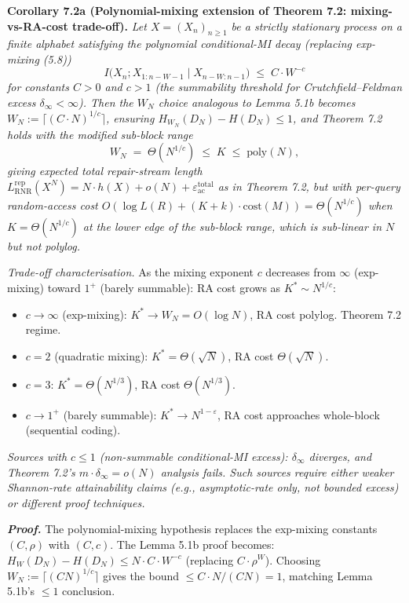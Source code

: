 \documentclass[
]{article}
\begin{document}
\textbf{Corollary 7.2a (Polynomial-mixing extension of Theorem 7.2:
mixing-vs-RA-cost trade-off).} \emph{Let $X = (X_n)_{n \geq 1}$ be
a strictly stationary process on a finite alphabet satisfying the
\emph{polynomial} conditional-MI decay (replacing exp-mixing (5.8))}
\[
I\bigl(X_n; X_{1:n-W-1} \mid X_{n-W:n-1}\bigr) \;\leq\; C \cdot W^{-c}
\]
\emph{for constants $C > 0$ and $c > 1$ (the summability threshold
for Crutchfield--Feldman excess $\delta_\infty < \infty$). Then the
$W_N$ choice analogous to Lemma 5.1b becomes
$W_N := \lceil (C \cdot N)^{1/c} \rceil$, ensuring
$H_{W_N}(D_N) - H(D_N) \leq 1$, and Theorem 7.2 holds with the
modified sub-block range}
\[
W_N \;=\; \Theta(N^{1/c}) \;\leq\; K \;\leq\; \mathrm{poly}(N),
\]
\emph{giving expected total repair-stream length
$L^{\mathrm{rep}}_{\mathrm{RNR}}(X^N) = N \cdot h(X) + o(N) +
\varepsilon_{\mathrm{ac}}^{\mathrm{total}}$ as in Theorem 7.2, but
with per-query random-access cost
$O(\log L(R) + (K+k) \cdot \mathrm{cost}(M)) = \Theta(N^{1/c})$
when $K = \Theta(N^{1/c})$ at the lower edge of the sub-block range,
which is \emph{sub-linear} in $N$ but \emph{not} polylog.}

\emph{Trade-off characterisation.} As the mixing exponent $c$
decreases from $\infty$ (exp-mixing) toward $1^+$ (barely summable):
RA cost grows as $K^* \sim N^{1/c}$:
\begin{itemize}
\item $c \to \infty$ (exp-mixing): $K^* \to W_N = O(\log N)$, RA cost
polylog. Theorem 7.2 regime.
\item $c = 2$ (quadratic mixing): $K^* = \Theta(\sqrt{N})$, RA cost
$\Theta(\sqrt{N})$.
\item $c = 3$: $K^* = \Theta(N^{1/3})$, RA cost $\Theta(N^{1/3})$.
\item $c \to 1^+$ (barely summable): $K^* \to N^{1-\varepsilon}$,
RA cost approaches whole-block (sequential coding).
\end{itemize}
\emph{Sources with $c \leq 1$ (non-summable conditional-MI excess):
$\delta_\infty$ diverges, and Theorem 7.2's $m \cdot \delta_\infty = o(N)$
analysis fails. Such sources require either weaker Shannon-rate
attainability claims (e.g., asymptotic-rate only, not bounded excess)
or different proof techniques.}

\emph{\textbf{Proof.}} The polynomial-mixing hypothesis replaces the
exp-mixing constants $(C, \rho)$ with $(C, c)$. The Lemma 5.1b proof
becomes:
$H_W(D_N) - H(D_N) \leq N \cdot C \cdot W^{-c}$ (replacing $C \cdot \rho^W$).
Choosing $W_N := \lceil (C N)^{1/c} \rceil$ gives the bound
$\leq C \cdot N / (CN) = 1$, matching Lemma 5.1b's $\leq 1$ conclusion.
\end{document}
